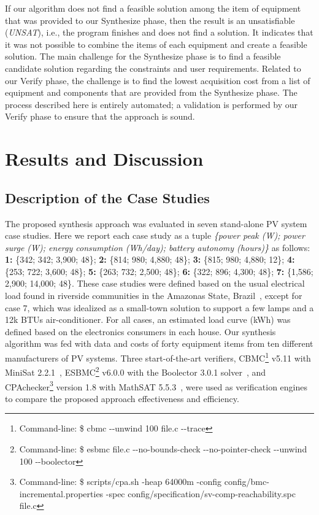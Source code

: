 \documentclass[runningheads]{llncs}
\begin{document}
If our algorithm does not find a feasible solution among the item of equipment that was provided to our {\sc Synthesize} phase, then the result is an unsatisfiable (\textit{UNSAT}), i.e., the program finishes and does not find a solution. It indicates that it was not possible to combine the items of each equipment and create a feasible solution. The main challenge for the {\sc Synthesize} phase is to find a feasible candidate solution regarding the constraints and user requirements. Related to our {\sc Verify} phase, the challenge is to find the lowest acquisition cost from a list of equipment and components that are provided from the {\sc Synthesize} phase. The process described here is entirely automated; a validation is performed by our {\sc Verify} phase to ensure that the approach is sound.

\section{Results and Discussion}
\subsection{Description of the Case Studies}

The proposed synthesis approach was evaluated in seven stand-alone PV system case studies. Here we report each case study as a tuple \textit{\{power peak (W); power surge (W); energy consumption (Wh/day); battery autonomy (hours)\}} as follows:
\textbf{1:} \{342; 342; 3,900; 48\}; \textbf{2:} \{814; 980; 4,880; 48\}; \textbf{3:} \{815; 980; 4,880; 12\}; \textbf{4:} \{253; 722; 3,600; 48\}; \textbf{5:} \{263; 732; 2,500; 48\}; \textbf{6:} \{322; 896; 4,300; 48\}; \textbf{7:} \{1,586; 2,900; 14,000; 48\}.
These case studies were defined based on the usual electrical load found in riverside communities in the Amazonas State, Brazil~\cite{TrindadeCordeiro19,Agrener2013}, except for case 7, which was idealized as a small-town solution to support a few lamps and a 12k BTUs air-conditioner. For all cases, an estimated load curve (kWh) was defined based on the electronics consumers in each house. Our synthesis algorithm was fed with data and costs of forty equipment items from ten different manufacturers of PV systems. 
%
Three start-of-the-art verifiers, CBMC\footnote{Command-line: \$ cbmc -\phantom{}-unwind 100 file.c -\phantom{}-trace} v5.11 with MiniSat 2.2.1~\cite{Kroening}, ESBMC\footnote{Command-line: \$ esbmc file.c -\phantom{}-no-bounds-check -\phantom{}-no-pointer-check -\phantom{}-unwind 100 -\phantom{}-boolector} v6.0.0 with the Boolector 3.0.1 solver~\cite{Brummayer}, and CPAchecker\footnote{Command-line: \$ scripts/cpa.sh -heap 64000m -config config/bmc-incremental.properties -spec config/specification/sv-comp-reachability.spc file.c} version 1.8 with MathSAT 5.5.3~\cite{mathsat5}, were used as verification engines to compare the proposed approach effectiveness and efficiency. 
\end{document}
